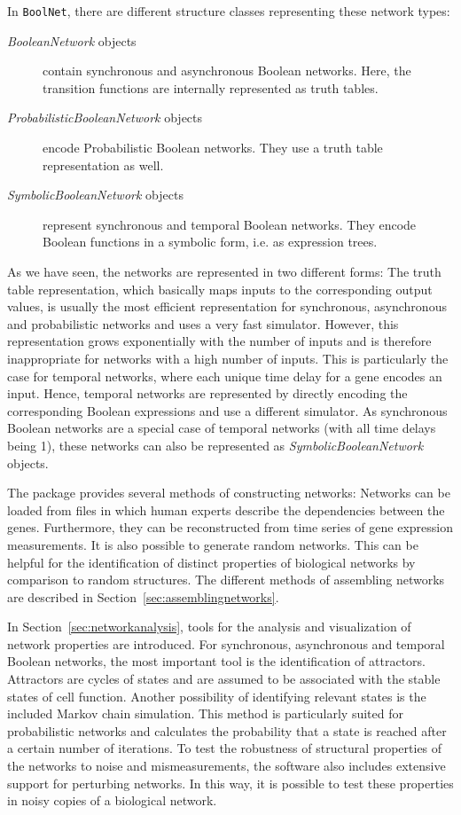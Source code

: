\documentclass[a4paper]{article}
\begin{document}
In \texttt{BoolNet}, there are different structure classes representing these network types:
\begin{description}
\item[\emph{BooleanNetwork} objects]{ contain synchronous and asynchronous Boolean networks. Here, the transition functions are internally represented as truth tables.}
\item[\emph{ProbabilisticBooleanNetwork} objects]{ encode Probabilistic Boolean networks. They use a truth table representation as well.}
\item[\emph{SymbolicBooleanNetwork} objects]{ represent synchronous and temporal Boolean networks. They encode Boolean functions in a symbolic form, i.e. as expression trees.}
\end{description}
As we have seen, the networks are represented in two different forms: The truth table representation, which basically maps inputs to the corresponding output values, is usually the most efficient representation for synchronous, asynchronous and probabilistic networks and uses a very fast simulator. However, this representation grows exponentially with the number of inputs and is therefore inappropriate for networks with a high number of inputs. This is particularly the case for temporal networks, where each unique time delay for a gene encodes an input. Hence, temporal networks are represented by directly encoding the corresponding Boolean expressions and use a different simulator. As synchronous Boolean networks are a special case of temporal networks (with all time delays being 1), these networks can also be represented as \emph{SymbolicBooleanNetwork} objects.

The package provides several methods of constructing networks:
Networks can be loaded from files in which human experts describe the dependencies between the genes. Furthermore, they can be reconstructed from time series of gene expression measurements. It is also possible to generate random networks. This can be helpful for the identification of distinct properties of biological networks by comparison to random structures. The different methods of assembling networks are described in Section~\ref{sec:assemblingnetworks}.

In Section~\ref{sec:networkanalysis}, tools for the analysis and visualization of network properties are introduced. For synchronous, asynchronous and temporal Boolean networks, the most important tool is the identification of attractors. Attractors are cycles of states and are assumed to be associated with the stable states of cell function. 
Another possibility of identifying relevant states is the included Markov chain simulation. This method is particularly suited for probabilistic networks and calculates the probability that a state is reached after a certain number of iterations. To test the robustness of structural properties of the networks to noise and mismeasurements, the software also includes extensive support for perturbing networks. In this way, it is possible to test these properties in noisy copies of a biological network.
\end{document}
